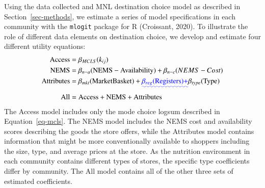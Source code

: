 \documentclass[
  letterpaper,
  number,
  review,
  3p]{elsarticle}
\providecommand{\DIFadd}[1]{{\protect\color{blue}\uwave{#1}}} %
\providecommand{\DIFaddbegin}{} %
\providecommand{\DIFaddend}{} %
\newcommand{\DIFaddincludegraphics}[2][]{{\color{blue}\fbox{\DIFOincludegraphics[#1]{#2}}}} %
\DeclareRobustCommand{\DIFaddbegin}{\DIFOaddbegin \let\includegraphics\DIFaddincludegraphics} %
\DeclareRobustCommand{\DIFaddend}{\DIFOaddend \let\includegraphics\DIFOincludegraphics} %
\begin{document}
Using the data collected and MNL destination choice model as described
in Section~\ref{sec-methods}, we estimate a series of model
specifications in each community with the \texttt{mlogit} package for R
(Croissant, 2020). To illustrate the role of different data elements on
destination choice, we develop and estimate four different utility
equations: \begin{align*}
\mathrm{Access} &= \beta_{MCLS}( k_{ij})\\
\mathrm{NEMS} &= \beta_{n-a} (\mathrm{NEMS-Availability}) + \beta_{n-c}\mathrm({NEMS-Cost})\\
\mathrm{Attributes} &= \beta_{mkt} (\mathrm{Market Basket}) + \DIFaddbegin \DIFadd{\beta_{reg} (\mathrm{Registers}) + }\DIFaddend \mathbf{\beta}_{type}(\mathrm{Type})\\
\mathrm{All} &= \mathrm{Access} + \mathrm{NEMS} + \mathrm{Attributes}\\
\end{align*} The Access model includes only the mode choice logsum
described in Equation~\ref{eq-mcls}. The NEMS model includes the NEMS
cost and availability scores describing the goods the store offers,
while the Attributes model contains information that might be more
conventionally available to shoppers including the size, type, and
average prices at the store. As the nutrition environment in each
community contains different types of stores, the specific type
coefficients differ by community. The All model contains all of the
other three sets of estimated coefficients.
\end{document}
